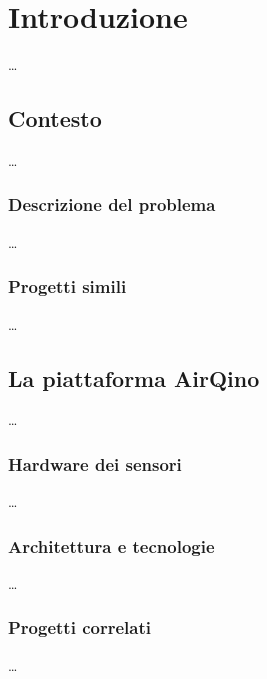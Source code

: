 \chapter{Introduzione}\label{ch:introduzione}
\ldots

\section{Contesto}\label{sec:contesto}
\ldots

\subsection{Descrizione del problema}\label{ssec:problema}
\ldots

\subsection{Progetti simili}\label{ssec:competitor}
\ldots

\section{La piattaforma AirQino}\label{sec:airqino}
\ldots

\subsection{Hardware dei sensori}\label{ssec:hardware}
\ldots

\subsection{Architettura e tecnologie}\label{ssec:airqino-architettura}
\ldots

\subsection{Progetti correlati}\label{ssec:correlati}
\ldots